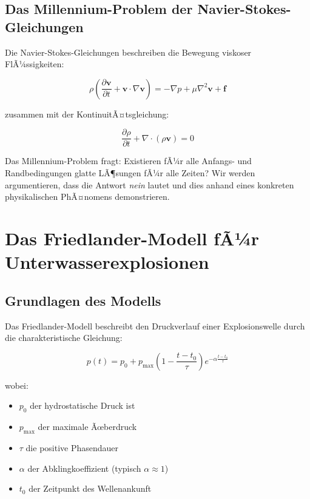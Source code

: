 ﻿\documentclass[12pt,a4paper]{article}
\theoremstyle{definition}
\theoremstyle{remark}
\begin{document}
\subsection{Das Millennium-Problem der Navier-Stokes-Gleichungen}

Die Navier-Stokes-Gleichungen beschreiben die Bewegung viskoser FlÃ¼ssigkeiten:

\begin{equation}
\rho \left( \frac{\partial \mathbf{v}}{\partial t} + \mathbf{v} \cdot \nabla \mathbf{v} \right) = -\nabla p + \mu \nabla^2 \mathbf{v} + \mathbf{f}
\end{equation}

zusammen mit der KontinuitÃ¤tsgleichung:

\begin{equation}
\frac{\partial \rho}{\partial t} + \nabla \cdot (\rho \mathbf{v}) = 0
\end{equation}

Das Millennium-Problem fragt: Existieren fÃ¼r alle Anfangs- und Randbedingungen glatte LÃ¶sungen fÃ¼r alle Zeiten? Wir werden argumentieren, dass die Antwort \textit{nein} lautet und dies anhand eines konkreten physikalischen PhÃ¤nomens demonstrieren.

\section{Das Friedlander-Modell fÃ¼r Unterwasserexplosionen}

\subsection{Grundlagen des Modells}

Das Friedlander-Modell beschreibt den Druckverlauf einer Explosionswelle durch die charakteristische Gleichung:

\begin{equation}
p(t) = p_0 + p_{\text{max}} \left(1 - \frac{t-t_0}{\tau}\right) e^{-\alpha \frac{t-t_0}{\tau}}
\end{equation}

wobei:
\begin{itemize}
\item $p_0$ der hydrostatische Druck ist
\item $p_{\text{max}}$ der maximale Ãœberdruck
\item $\tau$ die positive Phasendauer
\item $\alpha$ der Abklingkoeffizient (typisch $\alpha \approx 1$)
\item $t_0$ der Zeitpunkt des Wellenankunft
\end{itemize}
\end{document}

